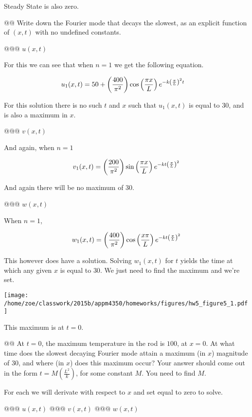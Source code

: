 \documentclass[10pt]{article}
\begin{document}
\begin{easylist}[enumerate]
    Steady State is also zero.

    @@ Write down the Fourier mode that decays the slowest, as an explicit function of $(x, t)$ with no undefined
    constants.

    @@@ $u(x, t)$

    For this we can see that when $n=1$ we get the following equation.

    \begin{align*}
        u_1(x, t) &= 50 + \left( \frac{400}{\pi^{2}} \right) \cos\left( \frac{\pi x}{L} \right) e^{-k{\left( \frac{\pi}{L} \right)}^2t}
    \end{align*}

    For this solution there is no such $t$ and $x$ such that $u_1(x, t)$ is equal to 30, and is also a maximum in $x$.

    @@@ $v(x, t)$

    And again, when $n = 1$

    \[
        v_1(x, t) = \left( \frac{200}{\pi^{2}} \right) \sin\left( \frac{\pi x}{L} \right) e^{-kt \left( \frac{\pi}{L} \right)^2}
    \]

    And again there will be no maximum of 30.

    @@@ $w(x, t)$

    When $n = 1$,

    \[
        w_1(x, t) = \left( \frac{400}{\pi^2} \right) \cos\left( \frac{x\pi}{L} \right) e^{-kt \left( \frac{\pi}{L} \right)^2}
    \]

    This however does have a solution. Solving $w_1(x, t)$ for $t$ yields the time at which any given $x$ is equal to
    $30$. We just need to find the maximum and we're set.

\simpleweave

\texttt{[image: /home/zoe/classwork/2015b/appm4350/homeworks/figures/hw5\_figure5\_1.pdf]}

\nosimpleweave

    This maximum is at $t=0$.

    @@ At $t = 0$, the maximum temperature in the rod is $100$, at $x = 0$. At what time does the slowest decaying
    Fourier mode attain a maximum (in $x$) magnitude of $30$, and where (in $x$) does this maximum occur? Your answer
    should come out in the form $t = M \left( \frac{L^2}{k} \right)$, for some constant $M$. You need to find $M$.

    For each we will derivate with respect to $x$ and set equal to zero to solve.

    @@@ $u(x, t)$
    @@@ $v(x, t)$
    @@@ $w(x, t)$


\end{easylist}
\end{document}
